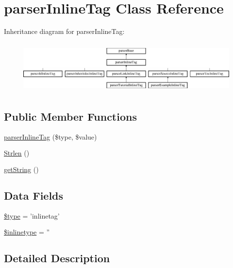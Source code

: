 \hypertarget{classparser_inline_tag}{\section{parser\-Inline\-Tag \-Class \-Reference}
\label{classparser_inline_tag}
}
\-Inheritance diagram for parser\-Inline\-Tag\-:\begin{figure}[H]
\begin{center}
\leavevmode
\includegraphics[height=2.731707cm]{classparser_inline_tag}
\end{center}
\end{figure}
\subsection*{\-Public \-Member \-Functions}
\begin{DoxyCompactItemize}
\item 
\hyperlink{classparser_inline_tag_af990783211a6548382c483a73c3e136b}{parser\-Inline\-Tag} (\$type, \$value)
\item 
\hyperlink{classparser_inline_tag_a92d09a6e9b43c6fde4e695c0decc73cd}{\-Strlen} ()
\item 
\hyperlink{classparser_inline_tag_afde980915cc78c408e6ac75b662e631c}{get\-String} ()
\end{DoxyCompactItemize}
\subsection*{\-Data \-Fields}
\begin{DoxyCompactItemize}
\item 
\hyperlink{classparser_inline_tag_a9a4a6fba2208984cabb3afacadf33919}{\$type} = 'inlinetag'
\item 
\hyperlink{classparser_inline_tag_a7583c1b3912b7afa3f038eb353a6ad97}{\$inlinetype} = ''
\end{DoxyCompactItemize}


\subsection{\-Detailed \-Description}


